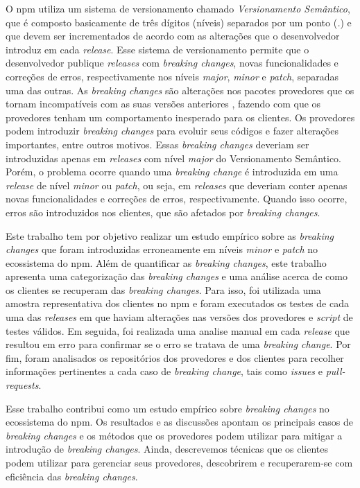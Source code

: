 O \textsf{npm} utiliza um sistema de versionamento chamado \textit{Versionamento Semântico}, que é composto basicamente de três dígitos (níveis) separados por um ponto (\textit{.}) e que devem ser incrementados de acordo com as alterações que o desenvolvedor introduz em cada \textit{release}. Esse sistema de versionamento permite que o desenvolvedor publique \textit{releases} com \textit{breaking changes}, novas funcionalidades e correções de erros, respectivamente nos níveis \textit{major}, \textit{minor} e \textit{patch}, separadas uma das outras. As \textit{breaking changes} são alterações nos pacotes provedores que os tornam incompatíveis com as suas versões anteriores \cite{intro:break_change}, fazendo com que os provedores tenham um comportamento inesperado para os clientes. Os provedores podem introduzir \textit{breaking changes} para evoluir seus códigos e fazer alterações importantes, entre outros motivos. Essas \textit{breaking changes} deveriam ser introduzidas apenas em \textit{releases} com nível \textit{major} do Versionamento Semântico. Porém, o problema ocorre quando uma \textit{breaking change} é introduzida em uma \textit{release} de nível \textit{minor} ou \textit{patch}, ou seja, em \textit{releases} que deveriam conter apenas novas funcionalidades e correções de erros, respectivamente. Quando isso ocorre, erros são introduzidos nos clientes, que são afetados por \textit{breaking changes}.

Este trabalho tem por objetivo realizar um estudo empírico sobre as \textit{breaking changes} que foram introduzidas erroneamente em níveis \textit{minor} e \textit{patch} no ecossistema do \textsf{npm}. Além de quantificar as \textit{breaking changes}, este trabalho apresenta uma categorização das \textit{breaking changes} e uma análise acerca de como os clientes se recuperam das \textit{breaking changes}. Para isso, foi utilizada uma amostra representativa dos clientes no \textsf{npm} e foram executados os testes de cada uma das \textit{releases} em que haviam alterações nas versões dos provedores e \textit{script} de testes válidos. Em seguida, foi realizada uma analise manual em cada \textit{release} que resultou em erro para confirmar se o erro se tratava de uma \textit{breaking change}. Por fim, foram analisados os repositórios dos provedores e dos clientes para recolher informações pertinentes a cada caso de \textit{breaking change}, tais como \textit{issues} e \textit{pull-requests}.

Esse trabalho contribui como um estudo empírico sobre \textit{breaking changes} no ecossistema do \textsf{npm}. Os resultados e as discussões apontam os principais casos de \textit{breaking changes} e os métodos que os provedores podem utilizar para mitigar a introdução de \textit{breaking changes}. Ainda, descrevemos técnicas que os clientes podem utilizar para gerenciar seus provedores, descobrirem e recuperarem-se com eficiência das \textit{breaking changes}.

